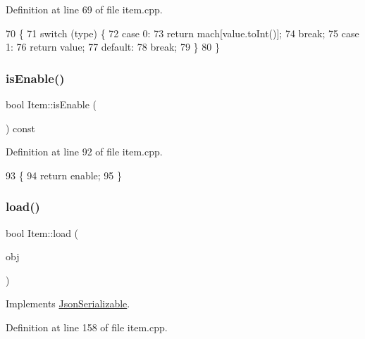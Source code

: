 Definition at line 69 of file item.\+cpp.


\begin{DoxyCode}
70 \{
71     \textcolor{keywordflow}{switch} (type) \{
72     \textcolor{keywordflow}{case} 0:
73         \textcolor{keywordflow}{return} mach[value.toInt()];
74         \textcolor{keywordflow}{break};
75     \textcolor{keywordflow}{case} 1:
76         \textcolor{keywordflow}{return} value;
77     \textcolor{keywordflow}{default}:
78         \textcolor{keywordflow}{break};
79     \}
80 \}
\end{DoxyCode}
\mbox{\label{class_item_a608527e7705b8f8640e3bdba3fb94415}} 
\subsubsection{\texorpdfstring{is\+Enable()}{isEnable()}}
{\footnotesize\ttfamily bool Item\+::is\+Enable (\begin{DoxyParamCaption}{ }\end{DoxyParamCaption}) const}



Definition at line 92 of file item.\+cpp.


\begin{DoxyCode}
93 \{
94     \textcolor{keywordflow}{return} enable;
95 \}
\end{DoxyCode}
\mbox{\label{class_item_aa089e9749b9a19492d45bb02c2135b48}} 
\subsubsection{\texorpdfstring{load()}{load()}}
{\footnotesize\ttfamily bool Item\+::load (\begin{DoxyParamCaption}\item[{Q\+Json\+Object}]{obj }\end{DoxyParamCaption})\hspace{0.3cm}{\ttfamily [virtual]}}



Implements \hyperlink{class_json_serializable_a881aaead36cbf7d097bddfa08f204fd9}{Json\+Serializable}.



Definition at line 158 of file item.\+cpp.


